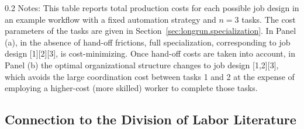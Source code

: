 \begin{table}[!t]
    \caption{Role of Hand-off Costs in Organizational Structure}
    \vspace{-0.3cm}
    \centering
    \label{tab:job_design}
    \footnotesize
    \begin{minipage}{1\linewidth}
\begin{spacing}{0.2}
{\fontsize{9.5pt}{10pt}\selectfont Notes: This table reports total production costs for each possible job design in an example workflow with a fixed automation strategy and $n = 3$ tasks.
The cost parameters of the tasks are given in Section~\ref{sec:longrun.specialization}.
In Panel (a), in the absence of hand-off frictions, full specialization, corresponding to job design [1][2][3], is cost-minimizing.
Once hand-off costs are taken into account, in Panel (b) the optimal organizational structure changes to job design [1,2][3], which avoids the large coordination cost between tasks 1 and 2 at the expense of employing a higher-cost (more skilled) worker to complete those tasks.}
\end{spacing}
\end{minipage}
\end{table}


\subsection{Connection to the Division of Labor Literature}

